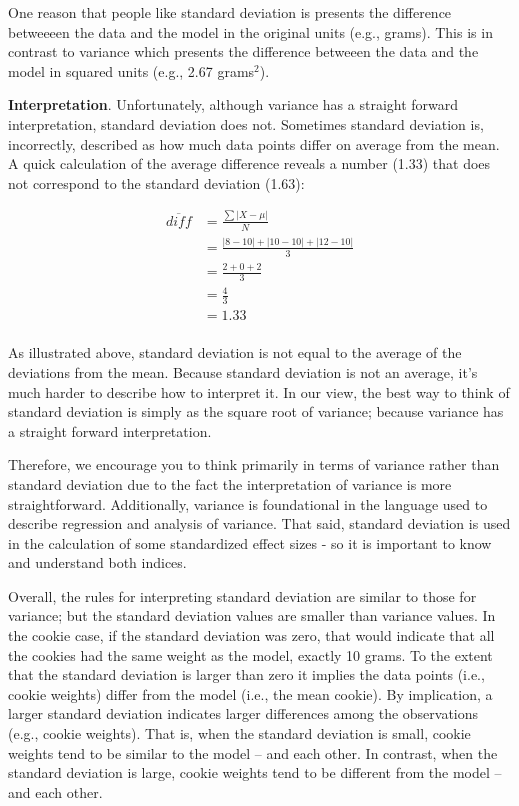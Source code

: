 \documentclass[
]{krantz}
\begin{document}
One reason that people like standard deviation is presents the difference betweeeen the data and the model in the original units (e.g., grams). This is in contrast to variance which presents the difference betweeen the data and the model in squared units (e.g., 2.67 grams\(^2\)).

\textbf{Interpretation}. Unfortunately, although variance has a straight forward interpretation, standard deviation does not. Sometimes standard deviation is, incorrectly, described as how much data points differ on average from the mean. A quick calculation of the average difference reveals a number (1.33) that does not correspond to the standard deviation (1.63):

\[
\begin{aligned} 
\overline{diff} &= \frac{\sum{|X - \mu|}}{N}\\
&= \frac{|8-10| + |10-10| + |12 - 10|}{3}\\
&= \frac{2 + 0 + 2}{3}\\
&= \frac{4}{3}\\
&= 1.33\\
\end{aligned} 
\]

As illustrated above, standard deviation is not equal to the average of the deviations from the mean. Because standard deviation is not an average, it's much harder to describe how to interpret it. In our view, the best way to think of standard deviation is simply as the square root of variance; because variance has a straight forward interpretation.

Therefore, we encourage you to think primarily in terms of variance rather than standard deviation due to the fact the interpretation of variance is more straightforward. Additionally, variance is foundational in the language used to describe regression and analysis of variance. That said, standard deviation is used in the calculation of some standardized effect sizes - so it is important to know and understand both indices.

Overall, the rules for interpreting standard deviation are similar to those for variance; but the standard deviation values are smaller than variance values. In the cookie case, if the standard deviation was zero, that would indicate that all the cookies had the same weight as the model, exactly 10 grams. To the extent that the standard deviation is larger than zero it implies the data points (i.e., cookie weights) differ from the model (i.e., the mean cookie). By implication, a larger standard deviation indicates larger differences among the observations (e.g., cookie weights). That is, when the standard deviation is small, cookie weights tend to be similar to the model -- and each other. In contrast, when the standard deviation is large, cookie weights tend to be different from the model -- and each other.
\end{document}
